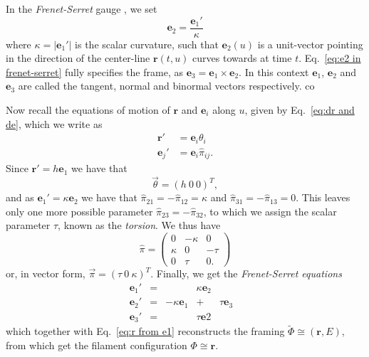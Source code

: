 In the \textit{Frenet-Serret} gauge \citep{frenetCourbesDoubleCourbure1852, serretQuelquesFormulesRelatives1851}, we set
\begin{equation} \label{eq:e2 in frenet-serret}
\mathbf{e}_2 = \frac{\mathbf{e}_1'}{\kappa}
\end{equation}
where $\kappa = |\mathbf{e}_1'|$ is the scalar curvature, such that $\mathbf{e}_2(u)$ is a unit-vector pointing in the direction of the center-line $\mathbf{r}(t,u)$ curves towards at time $t$. Eq.~\ref{eq:e2 in frenet-serret} fully specifies the frame, as $\mathbf{e}_3 = \mathbf{e}_1 \times \mathbf{e}_2$. In this context $\mathbf{e}_1$, $\mathbf{e}_2$ and $\mathbf{e}_3$ are called the tangent, normal and binormal vectors respectively. co

Now recall the equations of motion of $\mathbf{r}$ and $\mathbf{e}_i$ along $u$, given by Eq.~\ref{eq:dr and de}, which we write as
\begin{subequations}
\begin{align}
\mathbf{r}' & = \mathbf{e}_i \theta_i \\
\mathbf{e}_j' & = \mathbf{e}_i \hat{\pi}_{ij}.
\end{align}
\end{subequations}
Since $\mathbf{r}' = h \mathbf{e}_1$ we have that
\begin{equation} \label{eq:theta for filament}
\vec{\theta} = (h\ 0\ 0)^T,
\end{equation}
and as $\mathbf{e}_1' = \kappa \mathbf{e}_2$ we have that $\hat{\pi}_{21} = - \hat{\pi}_{12} = \kappa$ and $\hat{\pi}_{31} = -\hat{\pi}_{13} = 0$. This leaves only one more possible parameter $\hat{\pi}_{23} = -\hat{\pi}_{32}$, to which we assign the scalar parameter $\tau$, known as the \textit{torsion}. We thus have
\begin{equation} \label{eq:pi for filament}
\hat{\pi} = \begin{pmatrix}
0 & - \kappa & 0 \\
\kappa & 0 & - \tau \\
0 & \tau & 0.
\end{pmatrix}
\end{equation}
or, in vector form, $\vec{\pi} = (\tau\ 0\ \kappa)^T$. Finally, we get the \textit{Frenet-Serret equations}
\begin{equation} \label{eq:frennet-serret equations}
\begin{matrix}
\mathbf{e}_1' & = & & \kappa \mathbf{e}_2 & \\
\mathbf{e}_2' & = & - \kappa \mathbf{e}_1 & + & \tau \mathbf{e}_3 & \\
\mathbf{e}_3' & = &  & \tau \mathbf{e}2  &
\end{matrix}
\end{equation}
which together with Eq.~\ref{eq:r from e1} reconstructs the framing $\tilde{\Phi} \cong (\mathbf{r}, E)$, from which get the filament configuration $\Phi \cong \mathbf{r}$.


